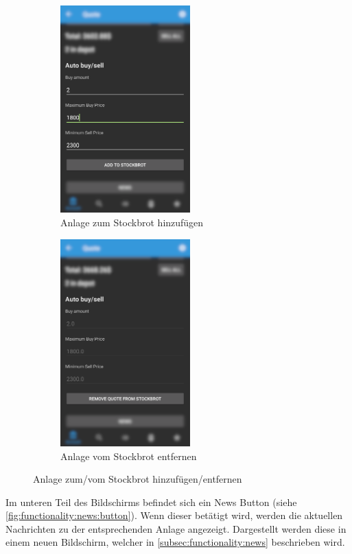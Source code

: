 \documentclass[a4paper]{article}
\begin{document}
\begin{figure}[H]
    \begin{subfigure}{.5\textwidth}
        \centering
        \includegraphics[height=8cm,keepaspectratio]{./images/stockbrot_add_before.png}
        \caption{Anlage zum Stockbrot hinzufügen}
        \label{fig:functionality:stockbrot:add}
    \end{subfigure}
    \begin{subfigure}{.5\textwidth}
        \centering
        \includegraphics[height=8cm,keepaspectratio]{./images/stockbrot_add_after.png}
        \caption{Anlage vom Stockbrot entfernen}
        \label{fig:functionality:stockbrot:remove}
    \end{subfigure}
    \caption{Anlage zum/vom Stockbrot hinzufügen/entfernen}
    \label{fig:functionality:stockbrot:addremove}
\end{figure}

Im unteren Teil des Bildschirms befindet sich ein News Button (siehe \autoref{fig:functionality:news:button}). Wenn dieser betätigt wird, werden die aktuellen Nachrichten zu der entsprechenden Anlage angezeigt. Dargestellt werden diese in einem neuen Bildschirm, welcher in \autoref{subsec:functionality:news} beschrieben wird.
\end{document}
